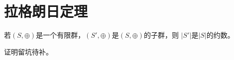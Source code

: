 \section{拉格朗日定理}
\begin{theorem}\label{LT}
	若$(S,\oplus)$是一个有限群，$(S',\oplus)$是$(S,\oplus)$的子群，则
	$|S'|$是$|S|$的约数。
\end{theorem}
证明留坑待补。
